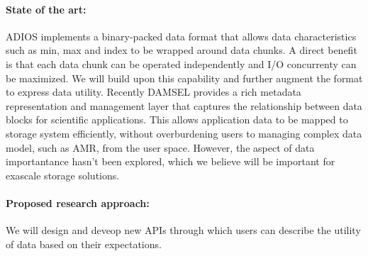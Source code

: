 \paragraph{State of the art:} ADIOS implements a binary-packed data format that allows
data characteristics such as min, max and index to be wrapped around data chunks. A
direct benefit is that each data chunk can be operated independently and I/O concurrenty
can be maximized. We will build upon this capability and further augment the format
to express data utility. Recently DAMSEL \cite{damsel} provides a rich metadata representation
and management layer that captures the relationship between data blocks for scientific applications.
This allows application data to be mapped to storage system efficiently, without overburdening
users to managing complex data model, such as AMR, from the user space. However, the aspect of 
data importantance hasn't been explored, which we believe will be important for exascale storage solutions. 

\paragraph{Proposed research approach:} 
We will design and deveop new APIs through which users can describe the utility of data
based on their expectations. 

